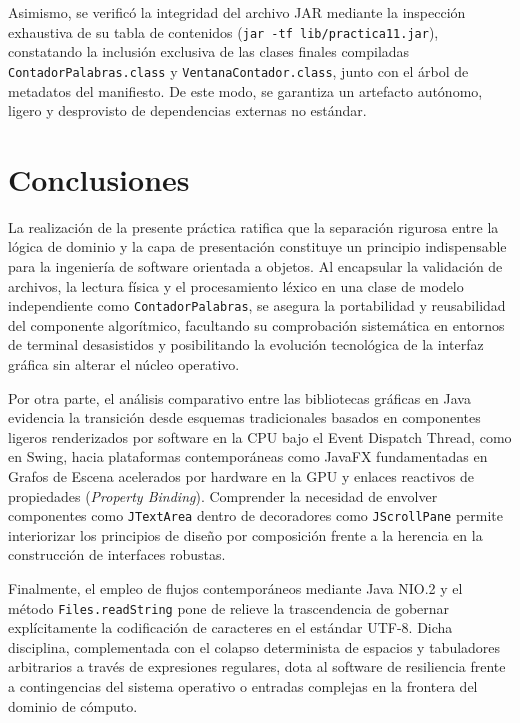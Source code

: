 \documentclass[letterpaper,12pt,oneside]{article}
\numberwithin{figure}{section}
\begin{document}
Asimismo, se verificó la integridad del archivo JAR mediante la inspección exhaustiva de su tabla de contenidos (\texttt{jar -tf lib/practica11.jar}), constatando la inclusión exclusiva de las clases finales compiladas \texttt{Contador\-Palabras.\-class} y \texttt{Ventana\-Contador.\-class}, junto con el árbol de metadatos del manifiesto. De este modo, se garantiza un artefacto autónomo, ligero y desprovisto de dependencias externas no estándar.

\clearpage
\section{Conclusiones}

La realización de la presente práctica ratifica que la separación rigurosa entre la lógica de dominio y la capa de presentación constituye un principio indispensable para la ingeniería de software orientada a objetos. Al encapsular la validación de archivos, la lectura física y el procesamiento léxico en una clase de modelo independiente como \texttt{ContadorPalabras}, se asegura la portabilidad y reusabilidad del componente algorítmico, facultando su comprobación sistemática en entornos de terminal desasistidos y posibilitando la evolución tecnológica de la interfaz gráfica sin alterar el núcleo operativo.

Por otra parte, el análisis comparativo entre las bibliotecas gráficas en Java evidencia la transición desde esquemas tradicionales basados en componentes ligeros renderizados por software en la CPU bajo el Event Dispatch Thread, como en Swing, hacia plataformas contemporáneas como JavaFX fundamentadas en Grafos de Escena acelerados por hardware en la GPU y enlaces reactivos de propiedades (\textit{Property Binding}). Comprender la necesidad de envolver componentes como \texttt{JTextArea} dentro de decoradores como \texttt{JScrollPane} permite interiorizar los principios de diseño por composición frente a la herencia en la construcción de interfaces robustas.

Finalmente, el empleo de flujos contemporáneos mediante Java NIO.2 y el método \texttt{Files.readString} pone de relieve la trascendencia de gobernar explícitamente la codificación de caracteres en el estándar UTF-8. Dicha disciplina, complementada con el colapso determinista de espacios y tabuladores arbitrarios a través de expresiones regulares, dota al software de resiliencia frente a contingencias del sistema operativo o entradas complejas en la frontera del dominio de cómputo.
\end{document}
